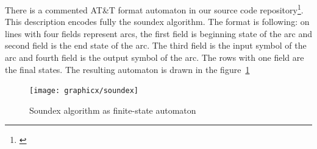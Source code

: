 \documentclass[a4paper,12pt]{article}
\begin{document}
There is a commented AT\&T format automaton in our source code
repository\footnote{\url{}}. This description encodes fully the soundex
algorithm.  The format is following: on lines with four fields represent arcs,
the first field is beginning state of the arc and second field is the end state
of the arc. The third field is the input symbol of the arc and fourth field is
the output symbol of the arc. The rows with one field are the final states. The
resulting automaton is drawn in the figure~\ref{fig:soundex}

\begin{figure}
    \centering
    \texttt{[image: graphicx/soundex]}
    \caption{Soundex algorithm as finite-state automaton
    \label{fig:soundex}}
\end{figure}
\end{document}
